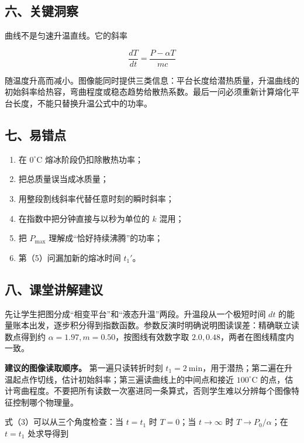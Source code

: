 \documentclass[12pt,a4paper,UTF8]{ctexart}
\newcommand{\tightlist}{\setlength{\itemsep}{0pt}\setlength{\parskip}{0pt}}
\begin{document}
\subsection{六、关键洞察}\label{ux516dux5173ux952eux6d1eux5bdf-7}

曲线不是匀速升温直线。它的斜率

\[
\frac{dT}{dt}=\frac{P-\alpha T}{mc}
\]

随温度升高而减小。图像能同时提供三类信息：平台长度给潜热质量，升温曲线的初始斜率给热容，弯曲程度或稳态趋势给散热系数。最后一问必须重新计算熔化平台长度，不能只替换升温公式中的功率。

\subsection{七、易错点}\label{ux4e03ux6613ux9519ux70b9-7}

\begin{enumerate}
\def\labelenumi{\arabic{enumi}.}
\tightlist
\item
  在 \(0^\circ\mathrm C\) 熔冰阶段仍扣除散热功率；
\item
  把总质量误当成冰质量；
\item
  用整段割线斜率代替任意时刻的瞬时斜率；
\item
  在指数中把分钟直接与以秒为单位的 \(k\) 混用；
\item
  把 \(P_{\max}\) 理解成``恰好持续沸腾''的功率；
\item
  第（5）问漏加新的熔冰时间 \(t_1'\)。
\end{enumerate}

\subsection{八、课堂讲解建议}\label{ux516bux8bfeux5802ux8bb2ux89e3ux5efaux8bae-7}

先让学生把图分成``相变平台''和``液态升温''两段。升温段从一个极短时间
\(dt\)
的能量账本出发，逐步积分得到指数函数。参数反演时明确说明图读误差：精确联立读数点得到约
\(\alpha=1.97,m=0.50\)，按图线有效数字取
\(2.0,0.48\)，两者在图线精度内一致。

\textbf{建议的图像读取顺序。} 第一遍只读转折时刻
\(t_1=2\ \mathrm{min}\)，用于潜热；第二遍在升温起点作切线，估计初始斜率；第三遍读曲线上的中间点和接近
\(100^\circ\mathrm C\)
的点，估计弯曲程度。不要把所有读数一次塞进同一条算式，否则学生难以分辨每个图像特征控制哪个物理量。

式（3）可以从三个角度检查：当 \(t=t_1\) 时 \(T=0\)；当 \(t\to\infty\) 时
\(T\to P_0/\alpha\)；在 \(t=t_1\) 处求导得到
\end{document}
